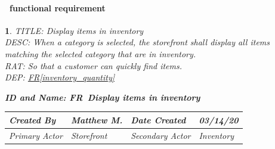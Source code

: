 \documentclass{scrreprt}
\theoremstyle{funreq}
\newtheorem{funreq}{}
\newcommand*{\reqref}[1]{\hyperref[#1]{FR\ref*{#1}}}
\begin{document}
\paragraph[]{\Subsectionname ~functional requirement }
\begin{funreq}
	\label{store_listcategory}
	TITLE: Display items in inventory\\
	DESC: When a category is selected, the storefront shall display all items matching the selected category that are in inventory.\\
	RAT: So that a customer can quickly find items.\\
	DEP: \reqref{inventory_quantity}\\
	

	\begin{table}[H]
		\begin{flushleft}\bfseries{ID and Name: FR\thefunreq ~\hspace{.6cm}Display items in inventory}\normalfont\end{flushleft}
		\begin{tabularx}{\columnwidth}{|X|X|X|X|}
			\hline
			Created By    & Matthew M. & Date Created    & 03/14/20 \\ \hline
			Primary Actor & Storefront        & Secondary Actor & Inventory \\ \hline
		\end{tabularx}
		

\end{table}
\end{funreq}
\end{document}
